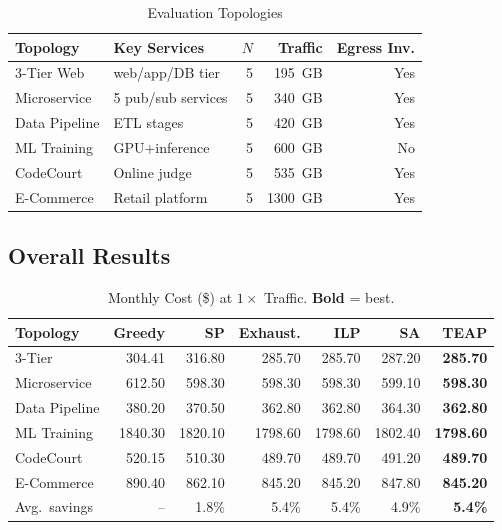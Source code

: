 \documentclass[sigconf,10pt]{acmart}
\begin{document}
\begin{table}[h]
\centering\caption{Evaluation Topologies}\label{tab:topologies}
\footnotesize\setlength{\tabcolsep}{4pt}
\begin{tabular}{llrrr}
\toprule
Topology & Key Services & $N$ & Traffic & Egress Inv.\\
\midrule
3-Tier Web   & web/app/DB tier    & 5 & 195~GB & Yes\\
Microservice & 5 pub/sub services & 5 & 340~GB & Yes\\
Data Pipeline& ETL stages         & 5 & 420~GB & Yes\\
ML Training  & GPU+inference      & 5 & 600~GB & No\\
CodeCourt    & Online judge       & 5 & 535~GB & Yes\\
E-Commerce   & Retail platform    & 5 & 1300~GB & Yes\\
\bottomrule
\end{tabular}
\end{table}

\subsection{Overall Results}

\begin{table}[h]
\centering\caption{Monthly Cost (\$) at $1\times$ Traffic. \textbf{Bold} = best.}
\label{tab:results}
\footnotesize\setlength{\tabcolsep}{3pt}
\begin{tabular}{lrrrrrr}
\toprule
Topology & Greedy & SP & Exhaust. & ILP & SA & \textbf{TEAP}\\
\midrule
3-Tier        & 304.41 & 316.80 & 285.70 & 285.70 & 287.20 & \textbf{285.70}\\
Microservice  & 612.50 & 598.30 & 598.30 & 598.30 & 599.10 & \textbf{598.30}\\
Data Pipeline & 380.20 & 370.50 & 362.80 & 362.80 & 364.30 & \textbf{362.80}\\
ML Training   &1840.30 &1820.10 &1798.60 &1798.60 &1802.40 & \textbf{1798.60}\\
CodeCourt     & 520.15 & 510.30 & 489.70 & 489.70 & 491.20 & \textbf{489.70}\\
E-Commerce    & 890.40 & 862.10 & 845.20 & 845.20 & 847.80 & \textbf{845.20}\\
\midrule
Avg.\ savings & -- & 1.8\% & 5.4\% & 5.4\% & 4.9\% & \textbf{5.4\%}\\
\bottomrule
\end{tabular}
\end{table}
\end{document}
